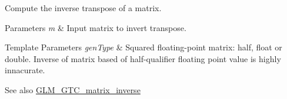 Compute the inverse transpose of a matrix.


\begin{DoxyParams}{Parameters}
{\em m} & Input matrix to invert transpose. \\
\hline
\end{DoxyParams}

\begin{DoxyTemplParams}{Template Parameters}
{\em gen\+Type} & Squared floating-\/point matrix\+: half, float or double. Inverse of matrix based of half-\/qualifier floating point value is highly innacurate. \\
\hline
\end{DoxyTemplParams}
\begin{DoxySeeAlso}{See also}
\mbox{\hyperlink{group__gtc__matrix__inverse}{G\+L\+M\+\_\+\+G\+T\+C\+\_\+matrix\+\_\+inverse}} 
\end{DoxySeeAlso}
